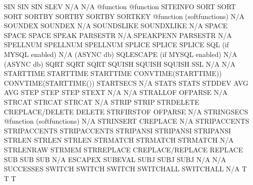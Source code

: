 \documentclass[letterpaper,10pt,english]{sphinxmanual}
\begin{document}
\begin{sphinxVerbatim}[commandchars=\\\{\}]
SIN                     SIN                          SIN
SLEV                    N/A                          N/A
@function               @function                    SITEINFO
SORT                    SORT                         SORT
SORTBY                  SORTBY                       SORTBY
SORTKEY                 @function (softfunctions)    N/A
SOUNDEX                 SOUNDEX                      N/A
SOUNDSLIKE              SOUNDXLIKE                   N/A
SPACE                   SPACE                        SPACE
SPEAK                   PARSESTR                     N/A
SPEAKPENN               PARSESTR                     N/A
SPELLNUM                SPELLNUM                     SPELLNUM
SPLICE                  SPLICE                       SPLICE
SQL                     (if MYSQL enabled)           N/A (ASYNC db)
SQLESCAPE               (if MYSQL enabled)           N/A (ASYNC db)
SQRT                    SQRT                         SQRT
SQUISH                  SQUISH                       SQUISH
SSL                     N/A                          N/A
STARTTIME               STARTTIME                    STARTTIME
CONVTIME(STARTTIME))    CONVTIME(STARTTIME())        STARTSECS
N/A                     STATS                        STATS
STDDEV                  AVG                          AVG
STEP                    STEP                         STEP
STEXT                   N/A                          N/A
STRALLOF                OFPARSE                      N/A
STRCAT                  STRCAT                       STRCAT
N/A                     STRIP                        STRIP
STRDELETE               CREPLACE/DELETE              DELETE
STRFIRSTOF              OFPARSE                      N/A
STRINGSECS              @function (softfunctions)    N/A
STRINSERT               CREPLACE                     N/A
STRIPACCENTS            STRIPACCENTS                 STRIPACCENTS
STRIPANSI               STRIPANSI                    STRIPANSI
STRLEN                  STRLEN                       STRLEN
STRMATCH                STRMATCH                     STRMATCH
N/A                     STRLENRAW                    STRMEM
STRREPLACE              CREPLACE/REPLACE             REPLACE
SUB                     SUB                          SUB
N/A                     ESCAPEX                      SUBEVAL
SUBJ                    SUBJ                         SUBJ
N/A                     N/A                          SUCCESSES
SWITCH                  SWITCH                       SWITCH
SWITCHALL               SWITCHALL                    N/A
T                       T                            T

\end{sphinxVerbatim}
\end{document}

